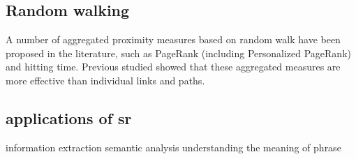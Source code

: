 \subsection{Random walking}
A number of aggregated proximity measures based on random walk have been proposed in the 
literature, such as PageRank (including Personalized PageRank) and hitting time. Previous
studied showed that these aggregated measures are more effective than individual links 
and paths.

\subsection{applications of sr}
information extraction
semantic analysis
understanding the meaning of phrase